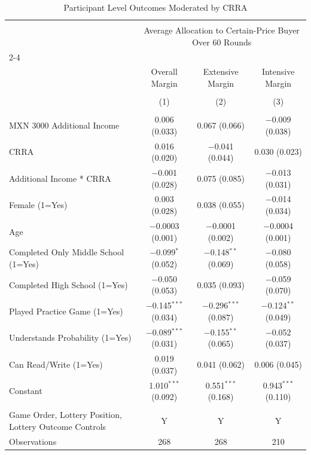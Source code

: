 
\begin{table}[!htbp] \centering 
  \caption{Participant Level Outcomes Moderated by CRRA} 
  \label{participant_level_outcomes_crra} 
\begin{tabular}{@{\extracolsep{5pt}}lccc} 
\\[-1.8ex]\hline 
\hline \\[-1.8ex] 
 & \multicolumn{3}{c}{Average Allocation to Certain-Price Buyer Over 60 Rounds} \\ 
\cline{2-4} 
\\[-1.8ex] & Overall Margin & Extensive Margin & Intensive Margin \\ 
\\[-1.8ex] & (1) & (2) & (3)\\ 
\hline \\[-1.8ex] 
 MXN 3000 Additional Income & 0.006 (0.033) & 0.067 (0.066) & $-$0.009 (0.038) \\ 
  CRRA & 0.016 (0.020) & $-$0.041 (0.044) & 0.030 (0.023) \\ 
  Additional Income * CRRA & $-$0.001 (0.028) & 0.075 (0.085) & $-$0.013 (0.031) \\ 
  Female (1=Yes) & 0.003 (0.028) & 0.038 (0.055) & $-$0.014 (0.034) \\ 
  Age & $-$0.0003 (0.001) & $-$0.0001 (0.002) & $-$0.0004 (0.001) \\ 
  Completed Only Middle School (1=Yes) & $-$0.099$^{*}$ (0.052) & $-$0.148$^{**}$ (0.069) & $-$0.080 (0.058) \\ 
  Completed High School (1=Yes) & $-$0.050 (0.053) & 0.035 (0.093) & $-$0.059 (0.070) \\ 
  Played Practice Game (1=Yes) & $-$0.145$^{***}$ (0.034) & $-$0.296$^{***}$ (0.087) & $-$0.124$^{**}$ (0.049) \\ 
  Understands Probability (1=Yes) & $-$0.089$^{***}$ (0.031) & $-$0.155$^{**}$ (0.065) & $-$0.052 (0.037) \\ 
  Can Read/Write (1=Yes) & 0.019 (0.037) & 0.041 (0.062) & 0.006 (0.045) \\ 
  Constant & 1.010$^{***}$ (0.092) & 0.551$^{***}$ (0.168) & 0.943$^{***}$ (0.110) \\ 
 \hline \\[-1.8ex] 
Game Order, Lottery Position, Lottery Outcome Controls & Y & Y & Y \\ 
Observations & 268 & 268 & 210 \\ 

\end{tabular}
\end{table}
